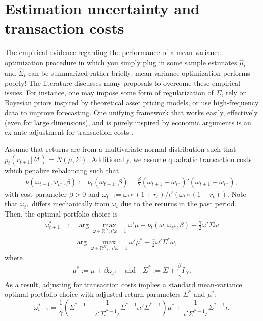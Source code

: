 \documentclass[
]{book}
\begin{document}
\hypertarget{estimation-uncertainty-and-transaction-costs}{%
\section{Estimation uncertainty and transaction costs}\label{estimation-uncertainty-and-transaction-costs}}

The empirical evidence regarding the performance of a mean-variance optimization procedure in which you simply plug in some sample estimates \(\hat \mu_t\) and \(\hat \Sigma_t\) can be summarized rather briefly: mean-variance optimization performs poorly! The literature discusses many proposals to overcome these empirical issues. For instance, one may impose some form of regularization of \(\Sigma\), rely on Bayesian priors inspired by theoretical asset pricing models, or use high-frequency data to improve forecasting. One unifying framework that works easily, effectively (even for large dimensions), and is purely inspired by economic arguments is an ex-ante adjustment for transaction costs \citep{Hautsch2019}.

Assume that returns are from a multivariate normal distribution such that \(p_t({r}_{t+1}|\mathcal{M})=N(\mu,\Sigma)\). Additionally, we assume quadratic transaction costs which penalize rebalancing such that \[
\begin{aligned}
\nu\left(\omega_{t+1},\omega_{t^+}, \beta\right) :=\nu_t\left(\omega_{t+1}, \beta\right) = \frac{\beta}{2} \left(\omega_{t+1} - \omega_{t^+}\right)'\left(\omega_{t+1}- \omega_{t^+}\right),\end{aligned}\]
with cost parameter \(\beta>0\) and \(\omega_{t^+} := {\omega_t \circ (1 +r_{t})}/{\iota' (\omega_t \circ (1 + r_{t}))}\). Note that \(\omega_{t^+}\) differs mechanically from \(\omega_t\) due to the returns in the past period.\\
Then, the optimal portfolio choice is
\[\begin{aligned}\omega_{t+1} ^* &:=  \arg\max_{\omega \in \mathbb{R}^N,  \iota'\omega = 1} \omega'\mu - \nu_t (\omega,\omega_{t^+}, \beta) - \frac{\gamma}{2}\omega'\Sigma\omega \\
&=\arg\max_{\omega\in\mathbb{R}^N,\text{ }  \iota'\omega=1}
\omega'\mu^* - \frac{\gamma}{2}\omega'\Sigma^* \omega ,\end{aligned}\]
where
\[\mu^*:=\mu+\beta \omega_{t^+} \quad  \text{and} \quad \Sigma^*:=\Sigma + \frac{\beta}{\gamma} I_N.\]
As a result, adjusting for transaction costs implies a standard mean-variance optimal portfolio choice with adjusted return parameters \(\Sigma^*\) and \(\mu^*\): \[\omega^*_{t+1} = \frac{1}{\gamma}\left(\Sigma^{*-1} - \frac{1}{\iota' \Sigma^{*-1}\iota }\Sigma^{*-1}\iota\iota' \Sigma^{*-1} \right) \mu^*  + \frac{1}{\iota' \Sigma^{*-1} \iota }\Sigma^{*-1} \iota.\]
\end{document}
